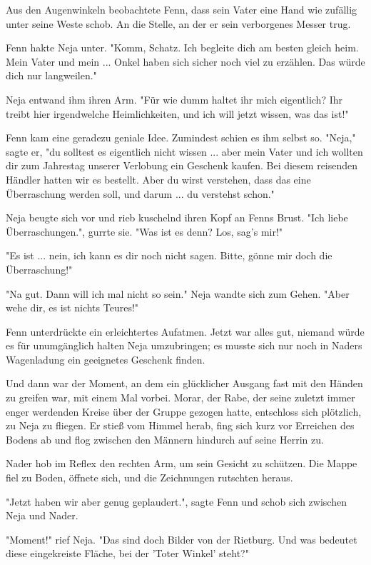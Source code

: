 \documentclass[10pt, a4paper, oneside]{book}
\begin{document}
\begin{multicols}{2}
Aus den Augenwinkeln beobachtete Fenn, dass sein Vater eine Hand wie zufällig unter seine Weste schob. An die Stelle, an der er sein verborgenes Messer trug.

Fenn hakte Neja unter. "Komm, Schatz. Ich begleite dich am besten gleich heim. Mein Vater und mein ... Onkel haben sich sicher noch viel zu erzählen. Das würde dich nur langweilen."

Neja entwand ihm ihren Arm. "Für wie dumm haltet ihr mich eigentlich? Ihr treibt hier irgendwelche Heimlichkeiten, und ich will jetzt wissen, was das ist!"

Fenn kam eine geradezu geniale Idee. Zumindest schien es ihm selbst so. "Neja," sagte er, "du solltest es eigentlich nicht wissen ... aber mein Vater und ich wollten dir zum Jahrestag unserer Verlobung ein Geschenk kaufen. Bei diesem reisenden Händler hatten wir es bestellt. Aber du wirst verstehen, dass das eine Überraschung werden soll, und darum ... du verstehst schon."

Neja beugte sich vor und rieb kuschelnd ihren Kopf an Fenns Brust. "Ich liebe Überraschungen.", gurrte sie. "Was ist es denn? Los, sag's mir!"

"Es ist ... nein, ich kann es dir noch nicht sagen. Bitte, gönne mir doch die Überraschung!"

"Na gut. Dann will ich mal nicht so sein." Neja wandte sich zum Gehen. "Aber wehe dir, es ist nichts Teures!"

Fenn unterdrückte ein erleichtertes Aufatmen. Jetzt war alles gut, niemand würde es für unumgänglich halten Neja umzubringen; es musste sich nur noch in Naders Wagenladung ein geeignetes Geschenk finden.

Und dann war der Moment, an dem ein glücklicher Ausgang fast mit den Händen zu greifen war, mit einem Mal vorbei. Morar, der Rabe, der seine zuletzt immer enger werdenden Kreise über der Gruppe gezogen hatte, entschloss sich plötzlich, zu Neja zu fliegen. Er stieß vom Himmel herab, fing sich kurz vor Erreichen des Bodens ab und flog zwischen den Männern hindurch auf seine Herrin zu.

Nader hob im Reflex den rechten Arm, um sein Gesicht zu schützen. Die Mappe fiel zu Boden, öffnete sich, und die Zeichnungen rutschten heraus.

"Jetzt haben wir aber genug geplaudert.", sagte Fenn und schob sich zwischen Neja und Nader.

"Moment!" rief Neja. "Das sind doch Bilder von der Rietburg. Und was bedeutet diese eingekreiste Fläche, bei der 'Toter Winkel' steht?" 


\end{multicols}
\end{document}
